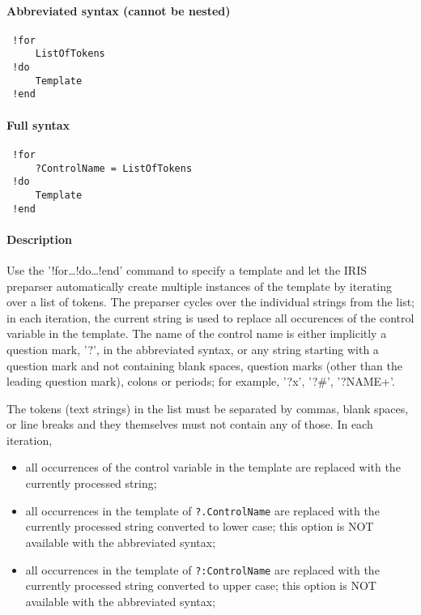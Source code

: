 


	\paragraph{Abbreviated syntax (cannot be nested)}
 
 \begin{verbatim}
 !for
     ListOfTokens
 !do
     Template
 !end
 \end{verbatim}
 
 \paragraph{Full syntax}
 
 \begin{verbatim}
 !for
     ?ControlName = ListOfTokens
 !do
     Template
 !end
 \end{verbatim}
 
 \paragraph{Description}
 
 Use the '!for\ldots{}!do\ldots{}!end' command to specify a template and
 let the IRIS preparser automatically create multiple instances of the
 template by iterating over a list of tokens. The preparser cycles over
 the individual strings from the list; in each iteration, the current
 string is used to replace all occurences of the control variable in the
 template. The name of the control name is either implicitly a question
 mark, '?', in the abbreviated syntax, or any string starting with a
 question mark and not containing blank spaces, question marks (other
 than the leading question mark), colons or periods; for example, '?x',
 '?\#', '?NAME+'.
 
 The tokens (text strings) in the list must be separated by commas, blank
 spaces, or line breaks and they themselves must not contain any of
 those. In each iteration,
 
 \begin{itemize}
 \item
   all occurrences of the control variable in the template are replaced
   with the currently processed string;
 \item
   all occurrences in the template of \texttt{?.ControlName} are replaced
   with the currently processed string converted to lower case; this
   option is NOT available with the abbreviated syntax;
 \item
   all occurrences in the template of \texttt{?:ControlName} are replaced
   with the currently processed string converted to upper case; this
   option is NOT available with the abbreviated syntax;
 \end{itemize}
 
